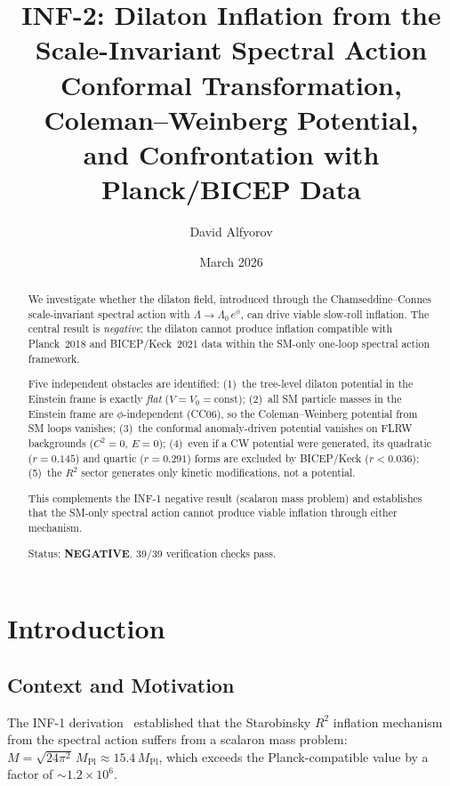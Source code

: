 \documentclass[11pt,a4paper]{article}
\title{INF-2: Dilaton Inflation from the\\
Scale-Invariant Spectral Action\\[6pt]
\large Conformal Transformation, Coleman--Weinberg Potential,\\
and Confrontation with Planck/BICEP Data}
\author{David Alfyorov}
\date{March 2026}
\theoremstyle{plain}
\theoremstyle{definition}
\begin{document}
\maketitle

\begin{center}
\end{center}

\begin{abstract}
We investigate whether the dilaton field, introduced through the
Chamseddine--Connes scale-invariant spectral action with
$\Lambda \to \Lambda_0\,e^\phi$, can drive viable slow-roll inflation.
The central result is \emph{negative}: the dilaton cannot produce
inflation compatible with Planck~2018 and BICEP/Keck~2021 data within
the SM-only one-loop spectral action framework.

Five independent obstacles are identified:
(1)~the tree-level dilaton potential in the Einstein frame is exactly
\emph{flat} ($V = V_0 = \mathrm{const}$);
(2)~all SM particle masses in the Einstein frame are
$\phi$-independent (CC06), so the Coleman--Weinberg potential from SM
loops vanishes;
(3)~the conformal anomaly-driven potential vanishes on FLRW backgrounds
($C^2 = 0$, $E = 0$);
(4)~even if a CW potential were generated, its quadratic ($r = 0.145$)
and quartic ($r = 0.291$) forms are excluded by BICEP/Keck
($r < 0.036$);
(5)~the $R^2$ sector generates only kinetic modifications, not a
potential.

This complements the INF-1 negative result (scalaron mass problem) and
establishes that the SM-only spectral action cannot produce viable
inflation through either mechanism.

Status: \textbf{NEGATIVE}.  39/39 verification checks pass.
\end{abstract}

\tableofcontents

\section{Introduction}\label{sec:intro}

\subsection{Context and Motivation}

The INF-1 derivation~\cite{Alfyorov:2026ff} established that the
Starobinsky $R^2$ inflation mechanism from the spectral action
suffers from a scalaron mass problem:
$M = \sqrt{24\pi^2}\,M_{\mathrm{Pl}} \approx 15.4\,M_{\mathrm{Pl}}$,
which exceeds the Planck-compatible value by a factor of
$\sim 1.2 \times 10^6$.
\end{document}
